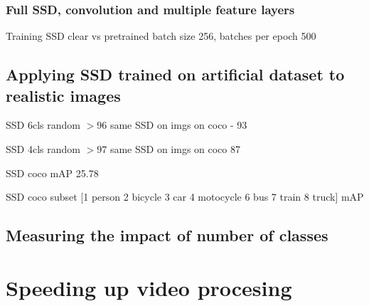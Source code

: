 \subsubsection{Full SSD, convolution and multiple feature layers}
Training SSD clear vs pretrained
batch size 256, batches per epoch 500




\subsection{Applying SSD trained on artificial dataset to realistic images}
SSD 6cls random $>96$
same SSD on imgs on coco - 93

SSD 4cls random $>97$
same SSD on imgs on coco 87


SSD coco mAP 25.78

SSD coco subset [1 person
2 bicycle
3 car
4 motocycle
6 bus
7 train
8 truck] mAP

\subsection{Measuring the impact of number of classes}

\section{Speeding up video procesing}